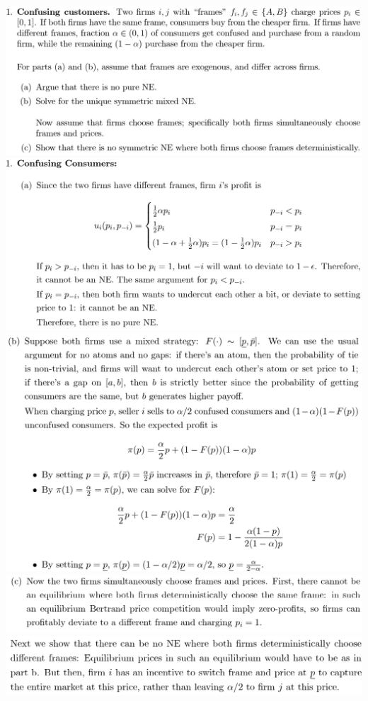 \documentclass[8pt,landscape]{extarticle}
\begin{document}
\raggedright
\footnotesize

\setlength{\columnsep}{0pt}

\begin{multicols*}{3}
    \includegraphics[width=0.85\linewidth,keepaspectratio]{Screenshots/Screenshot 2024-03-11 131747.png}
    \includegraphics[width=0.77\linewidth,keepaspectratio]{Screenshots/Screenshot 2024-03-11 131758.png}
    \includegraphics[width=0.74\linewidth,keepaspectratio]{Screenshots/Screenshot 2024-03-11 131805.png}
    \includegraphics[width=0.74\linewidth,keepaspectratio]{Screenshots/Screenshot 2024-03-11 131811.png}
    \includegraphics[width=0.71\linewidth,keepaspectratio]{Screenshots/Screenshot 2024-03-11 131818.png}

\end{multicols*}
\end{document}
